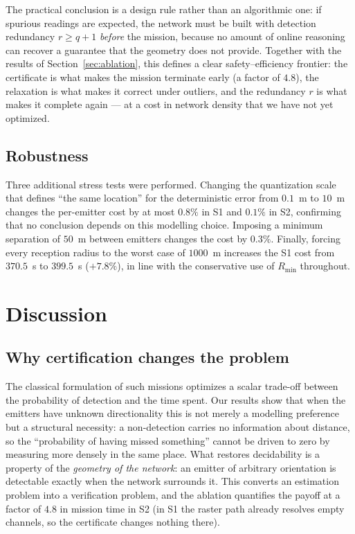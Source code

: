 \documentclass[preprint,12pt,3p]{elsarticle}
\theoremstyle{definition}
\newcommand{\Rmin}{R_{\min}}
\begin{document}
The practical conclusion is a design rule rather than an algorithmic one: if spurious readings
are expected, the network must be built with detection redundancy $r\ge q+1$ \emph{before} the
mission, because no amount of online reasoning can recover a guarantee that the geometry does not
provide. Together with the results of Section~\ref{sec:ablation}, this defines a clear
safety--efficiency frontier: the certificate is what makes the mission terminate early (a factor of
$4.8$), the relaxation is what makes it correct under outliers, and the redundancy $r$ is what
makes it complete again --- at a cost in network density that we have not yet optimized.

\subsection{Robustness}
Three additional stress tests were performed. Changing the quantization scale that defines
``the same location'' for the deterministic error from $0.1$~m to $10$~m changes the per-emitter
cost by at most $0.8\%$ in S1 and $0.1\%$ in S2, confirming that no conclusion depends on this
modelling choice. Imposing a minimum separation of $50$~m between emitters changes the cost by
$0.3\%$. Finally, forcing every reception radius to the worst case of $1000$~m increases the S1
cost from $370.5$~s to $399.5$~s ($+7.8\%$), in line with the conservative use of $\Rmin$
throughout.

\section{Discussion}
\label{sec:discussion}

\subsection{Why certification changes the problem}
The classical formulation of such missions optimizes a scalar trade-off between the probability of
detection and the time spent. Our results show that when the emitters have unknown directionality this is not merely a modelling preference but a structural necessity: a non-detection
carries no information about distance, so the ``probability of having missed something'' cannot be
driven to zero by measuring more densely in the same place. What restores decidability is a
property of the \emph{geometry of the network}: an emitter of arbitrary orientation is detectable
exactly when the network surrounds it. This converts an estimation problem into a verification
problem, and the ablation quantifies the payoff at a factor of $4.8$ in mission time in S2
(in S1 the raster path already resolves empty channels, so the certificate changes nothing there).
\end{document}
